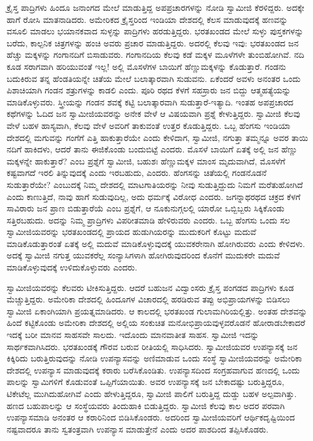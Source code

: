  ಕ್ರೈಸ್ತ ಪಾದ್ರಿಗಳು ಹಿಂದೂ ಜನಾಂಗದ ಮೇಲೆ ಮಾಡುತ್ತಿದ್ದ ಅಪಪ್ರಚಾರಗಳನ್ನು ನೋಡಿ ಸ್ವಾಮೀಜಿ ಕೆರಳಿದ್ದರು. ಅದಕ್ಕೇ ಹಾಗೆ ರೋಸಿ ಮಾತನಾಡಿದರು. ಅಮೇರಿಕದ ಕ್ರೈಸ್ತರಿಂದ ಇಂಡಿಯಾ ದೇಶದಲ್ಲಿ ಕೆಲಸ ಮಾಡುವುದಕ್ಕೆ ಹಣವನ್ನು ವಸೂಲಿ ಮಾಡಲು ಭಯಾನಕವಾದ ಸುಳ್ಳನ್ನು ಪಾದ್ರಿಗಳು ಹರಡುತ್ತಿದ್ದರು. ಭರತಖಂಡದ ಮೇಲೆ ಸುಳ್ಳು ಪುಸ್ತಕಗಳನ್ನು ಬರೆದು, ಕಾಲ್ಪನಿಕ ಚಿತ್ರಗಳನ್ನು ಹಂಚಿ ಅವರು ಪ್ರಚಾರ ಮಾಡುತ್ತಿದ್ದರು. ಅದರಲ್ಲಿ ಕೆಲವು ಇವು: ಭರತಖಂಡದ ಜನ ಹೆಚ್ಚು ಮಕ್ಕಳನ್ನು ಗಂಗಾನದಿಗೆ ಬಿಸಾಡುವರು. ಗಂಗಾನದಿಯ ಕೆಲವು ಕಡೆ ಮಕ್ಕಳ ಮೂಳೆಗಳೇ ತುಂಬಿಹೋಗಿವೆ. ನದಿ ಕೂಡ ಸರಾಗವಾಗಿ ಹರಿಯುವಂತೆ ಇಲ್ಲ! ಅಲ್ಲಿ ಮೊಸಳೆಗಳ ಬಾಯಿಗೆ ಹೆಣ್ಣುಮಕ್ಕಳನ್ನು ಕೊಡುತ್ತಾರೆ. ಗಂಡನು ಬದುಕಿರುವ ತನ್ನ ಹೆಂಡತಿಯನ್ನೇ ಚಿತೆಯ ಮೇಲೆ ಬಲಾತ್ಕಾರವಾಗಿ ಸುಡುವನು. ಏಕೆಂದರೆ ಅವಳು ಅನಂತರ ಒಂದು ಪಿಶಾಚಿಯಾಗಿ ಗಂಡನ ಶತ್ರುಗಳನ್ನು ಕಾಡಲಿ ಎಂದು. ಪೂರಿ ರಥದ ಕೆಳಗೆ ಸಹಸ್ರಾರು ಜನ ಬಿದ್ದು ಆತ್ಮಹತ್ಯೆಯನ್ನು ಮಾಡಿಕೊಳ್ಳುವರು. ಸ್ತ್ರೀಯನ್ನು ಗಂಡನ ಶವಕ್ಕೆ ಕಟ್ಟಿ ಬಲಾತ್ಕಾರವಾಗಿ ಸುಡುತ್ತಾರೆ-ಇತ್ಯಾದಿ. ಇಂತಹ ಅಪಪ್ರಚಾರದ ಕಥೆಗಳನ್ನು ಓದಿದ ಜನ ಸ್ವಾಮೀಜಿಯವರನ್ನು ಅನೇಕ ವೇಳೆ ಆ ವಿಷಯವಾಗಿ ಪ್ರಶ್ನೆ ಕೇಳುತ್ತಿದ್ದರು. ಸ್ವಾಮೀಜಿ ಕೆಲವು ವೇಳೆ ಬಹಳ ಹಾಸ್ಯವಾಗಿ, ಕೆಲವು ವೇಳೆ ಅವರಿಗೆ ತಾಕುವಂತೆ ಉತ್ತರ ಕೊಡುತ್ತಿದ್ದರು. ಒಬ್ಬ ಹೆಂಗಸು ಇಂಡಿಯಾ ದೇಶದಲ್ಲಿ ಮಗುವನ್ನು ಗಂಗೆಗೆ ಎತ್ತಿ ಹಾಕುತ್ತಾರೆಯೇ ಎಂದು ಕೇಳಿದಾಗ, ಸ್ವಾಮೀಜಿ, ನಗುತ್ತಾ ತಮ್ಮನ್ನೂ ಅವರ ತಾಯಿ ನದಿಗೆ ಹಾಕಿದಳು, ಆದರೆ ತಾನು ಈಜಿಕೊಂಡು ಬಂದುಬಿಟ್ಟೆ ಎಂದರು. ಮೊಸಳೆ ಬಾಯಿಗೆ ಏತಕ್ಕೆ ಅಲ್ಲಿ ಜನ ಹೆಣ್ಣು ಮಕ್ಕಳನ್ನೇ ಹಾಕುತ್ತಾರೆ? ಎಂಬ ಪ್ರಶ್ನೆಗೆ ಸ್ವಾಮೀಜಿ, ಬಹುಶಃ ಹೆಣ್ಣುಮಕ್ಕಳ ಮಾಂಸ ಮೃದುವಾಗಿದೆ, ಮೊಸಳೆಗೆ ಕಷ್ಟವಾಗದೆ ಇರಲಿ ತಿನ್ನುವುದಕ್ಕೆ ಎಂದು ಇರಬಹುದು, ಎಂದರು. ಹೆಂಗಸನ್ನು ಚಿತೆಯಲ್ಲಿ ಗಂಡನೊಡನೆ ಸುಡುತ್ತಾರೆಯೇ? ಎಂಬುದಕ್ಕೆ ನಿಮ್ಮ ದೇಶದಲ್ಲಿ ಮಾಟಗಾತಿಯರನ್ನು ನೀವು ಸುಡುತ್ತಿದ್ದುದು ನಿಮಗೆ ಮರೆತುಹೋಗಿದೆ ಎಂದು ಕಾಣುತ್ತಿದೆ, ನಾವು ಹಾಗೆ ಸುಡುವುದಿಲ್ಲ, ಅದು ಧರ್ಮಕ್ಕೆ ವಿರೋಧ ಎಂದರು. ಜಗನ್ನಾಥರಥದ ಚಕ್ರದ ಕೆಳಗೆ ಸಾವಿರಾರು ಜನ ಪ್ರಾಣ ಬಿಡುತ್ತಾರೆಯೆ ಎಂಬ ಪ್ರಶ್ನೆಗೆ, ಆ ನೂಕುನುಗ್ಗಲಲ್ಲಿ ಯಾರೋ ಒಬ್ಬಿಬ್ಬರು ಸಿಕ್ಕಿಕೊಂಡು ಸತ್ತಿರಬಹುದು. ಅದನ್ನು ನಿಮ್ಮ ಪ್ರಾದ್ರಿಗಳು ವಿಪರೀತಮಾಡಿ ಹೇಳಿರುವರು ಎಂದರು. ಒಬ್ಬ ಹೆಂಗಸು ಒಂದು ಸಲ ಸ್ವಾಮೀಜಿಯವರನ್ನು ಭರತಖಂಡದಲ್ಲಿ ಪ್ರಾಯದ ಹುಡುಗಿಯರನ್ನು ಮುದುಕರಿಗೆ ಕೊಟ್ಟು ಮದುವೆ ಮಾಡಿಕೊಡುತ್ತಾರಂತೆ ಏತಕ್ಕೆ ಅಲ್ಲಿ ಮದುವೆ ಮಾಡಿಕೊಳ್ಳುವುದಕ್ಕೆ ಯುವಕರೇನಾಗಿ ಹೋಗಿರುವರು ಎಂದು ಕೇಳಿದಳು. ಅದಕ್ಕೆ ಸ್ವಾಮೀಜಿ ನಗುತ್ತ ಯುವಕರೆಲ್ಲ ಸಂನ್ಯಾಸಿಗಳಾಗಿ ಹೋಗಿರುವುದರಿಂದ ಕೊನೆಗೆ ಮುದುಕರೇ ಮದುವೆ ಮಾಡಿಕೊಳ್ಳುವುದಕ್ಕೆ ಉಳಿದುಕೊಳ್ಳುವರು ಎಂದರು. 

 ಸ್ವಾಮೀಜಿಯವರನ್ನು ಕೆಲವರು ಟೀಕಿಸುತ್ತಿದ್ದರು. ಆದರೆ ಬಹುಜನ ವಿದ್ವಾಂಸರು ಕ್ರೈಸ್ತ ಪಂಗಡದ ಪಾದ್ರಿಗಳು ಕೂಡ ಮೆಚ್ಚುತ್ತಿದ್ದರು. ಅಮೇರಿಕಾ ದೇಶದಲ್ಲಿ ಹಿಂದೂಗಳ ವಿಚಾರದಲ್ಲಿ ಹರಡಿರುವ ತಪ್ಪು ಅಭಿಪ್ರಾಯಗಳನ್ನು ಬಿಡಿಸಲು ಸ್ವಾಮೀಜಿ ಏಕಾಂಗಿಯಾಗಿ ಪ್ರಯತ್ನಮಾಡಿದರು. ಆ ಕಾಲದಲ್ಲಿ ಭರತಖಂಡ ಗುಲಾಮಗಿರಿಯಲ್ಲಿತ್ತು. ಅಂತಹ ದೇಶವನ್ನು ಹಿಂದೆ ಕಟ್ಟಿಕೊಂಡು ಅಮೇರಿಕಾ ದೇಶದಲ್ಲಿ ಅಲ್ಲಿಯ ಸಂಕುಚಿತ ಮನೋಭಿಪ್ರಾಯವುಳ್ಳವರೊಡನೆ ಹೋರಾಡಬೇಕಾದರೆ ಇದಕ್ಕೆ ಬರೀ ಮಾನವ ಸಾಹಸವೇ ಸಾಲದು. ಇದೊಂದು ಮಾನವಾತೀತ ಸಾಹಸ. ಸ್ವಾಮೀಜಿ ಇದನ್ನು ಸಾರ್ಥಕವಾಗಿಸಿದರು. ಭರತಖಂಡಕ್ಕೆ ಗೌರವ ಬರುವ ರೀತಿಯಲ್ಲಿ ಸಾಧಿಸಿದರು. ಸ್ವಾಮೀಜಿಯವರ ಉಪನ್ಯಾಸಕ್ಕೆ ಜನ ಕಿಕ್ಕಿರಿದು ಬರುತ್ತಿರುವುದನ್ನು ನೋಡಿ ಉಪನ್ಯಾಸವನ್ನು ಅಣಿಮಾಡುವ ಒಂದು ಸಂಸ್ಥೆ ಸ್ವಾಮೀಜಿಯವರನ್ನು ಅಮೇರಿಕಾ ದೇಶದಲ್ಲಿ ಉಪನ್ಯಾಸ ಮಾಡುವುದಕ್ಕೆ ಕರಾರು ಬರೆಸಿಕೊಂಡಿತು. ಉಪನ್ಯಾಸದಿಂದ ಸಂಗ್ರಹವಾಗುವ ಹಣದಲ್ಲಿ ಒಂದು ಪಾಲನ್ನು ಸ್ವಾಮಿಗಳಿಗೆ ಕೊಡುವಂತೆ ಒಪ್ಪಿಗೆಯಾಯಿತು. ಅವರ ಉಪನ್ಯಾಸಕ್ಕೆ ಜನ ಬೇಕಾದಷ್ಟು ಬರುತ್ತಿದ್ದರೂ, ಟಿಕೇಟೆಲ್ಲ ಮುಗಿದುಹೋಗಿವೆ ಎಂದು ಹೇಳುತ್ತಿದ್ದರೂ, ಸ್ವಾಮೀಜಿ ಪಾಲಿಗೆ ಬರುತ್ತಿದ್ದ ದುಡ್ಡು ಬಹಳ ಅಲ್ಪವಾಗಿತ್ತು. ಹಣದ ಬಹುಪಾಲನ್ನು ಆ ಸಂಸ್ಥೆಯವರು ತಿಂದುಹಾಕಿ ಬಿಡುತ್ತಿದ್ದರು. ಸ್ವಾಮೀಜಿ ಕೆಲವು ಕಾಲ ಅದರ ಪರವಾಗಿ ಉಪನ್ಯಾಸಮಾಡಿ ಅನಂತರ ಆ ಕರಾರಿನಿಂದ ಬಿಡಿಸಿಕೊಂಡರು. ಅದರಿಂದ ಸ್ವಾಮೀಜಿಯವರಿಗೆ ಆರ್ಥಿಕದೃಷ್ಟಿಯಿಂದ ನಷ್ಟವಾದರೂ ತಾನು ಸ್ವತಂತ್ರವಾಗಿ ಉಪನ್ಯಾಸ ಮಾಡುತ್ತೇನೆ ಎಂದು ಅದರ ಪಾಶದಿಂದ ತಪ್ಪಿಸಿಕೊಡರು. 

